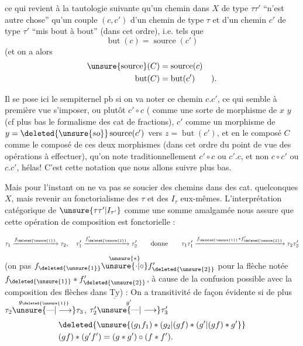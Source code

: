 
ce qui  revient à la tautologie suivante qu'un chemin  dans $X$ de type $\tau\tau'$ ``n'est autre chose'' qu'un couple $(c,c')$ d'un chemin  de type $\tau$ et d'un chemin $c'$ de type $\tau'$ ``mis bout à bout'' (dans cet ordre), i.e. tels que
\[
\operatorname{but}(c)=\operatorname{source}(c')
\]
(et on a alors
\[
\begin{aligned}
\operatorname{\unsure{source}}(C)&=\operatorname{source}(c)\\
\operatorname{but}(C)&=\operatorname{but}(c')\qquad ).
\end{aligned}
\]

Il se pose ici le sempiternel pb si on va noter ce chemin $c.c'$, ce qui semble à première vue s'imposer, ou plutôt $c'\circ c$ (   comme une  sorte de morphisme de $x$  $y$  (cf plus bas le formalisme des cat de fractions), $c'$ comme un morphisme de $y=\deleted{\unsure{so}}\operatorname{source}(c')$ vers $z=\operatorname{but}(c')$, et en  le composé $C$ comme le composé de ces deux morphismes  (dans cet ordre du point de vue des opérations à effectuer), qu'on note traditionnellement $c'\circ c$ ou $c'.c$, et non $c\circ c'$ ou $c.c'$, hélas! C'est cette notation que nous allons suivre plus bas.

Mais pour l'instant on ne va pas se soucier des chemins dans des cat. quelconques $X$, mais revenir au fonctorialisme des $\tau$ et des $I_\tau$ eux-mêmes. L'interprétation catégorique de $\unsure{\tau\tau'|I_{\tau'}}$ comme une somme amalgamée nous assure que cette opération de composition est fonctorielle :


\[
\tau_1\xrightarrow{f_{\deleted{\unsure{1}}}}\tau_2,\quad
\tau'_1\xrightarrow{f'_{\deleted{\unsure{2}}}}\tau'_2
\qquad\text{donne}\qquad
\tau_1\tau'_1\xrightarrow{f_{\deleted{\unsure{1}}}*f'_{\deleted{\unsure{2}}}}\tau_2\tau'_2
\]
(on  pas $f_{\deleted{\unsure{1}}}\overset{\unsure{*}}{\unsure{\cdot|\circ}}f'_{\deleted{\unsure{2}}}$ pour la flèche notée $f_{\deleted{\unsure{1}}}*f'_{\deleted{\unsure{2}}}$, à cause de la confusion possible avec la composition des flèches dans $\underline{\mathrm{Ty}}$) : On a transitivité de façon évidente si de plus $\tau_2\overset{g_{\deleted{\unsure{1}}}}{\unsure{\text{---}|\longrightarrow}}\tau_3$, $\tau'_2\overset{g'}{\unsure{\text{---}|\longrightarrow}}\tau'_3$
\[
\begin{aligned}
&\deleted{\unsure{(g_1f_1)*(g_2|(gf)*(g'|(gf)*g'}}\\
&(gf)*(g'f')=(g*g')\circ(f*f').
\end{aligned}
\]

